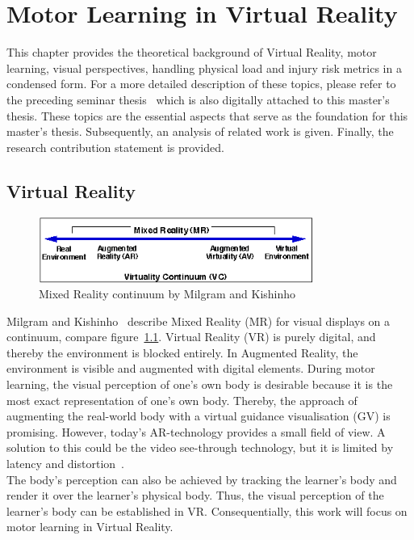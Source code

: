 \chapter{Motor Learning in Virtual Reality}
\label{chapter:theoretical_background}
This chapter provides the theoretical background of Virtual Reality, motor learning, visual perspectives, handling physical load and injury risk metrics in a condensed form. For a more detailed description of these topics, please refer to the preceding seminar thesis~\cite{seminarThesis} which is also digitally attached to this master's thesis. These topics are the essential aspects that serve as the foundation for this master's thesis. Subsequently, an analysis of related work is given. Finally, the research contribution statement is provided.

\section{Virtual Reality}
\label{section:mixed_reality}
\begin{figure}[htb]
	\centering
	\includegraphics[width=0.8\textwidth]{figures/milgram_continuum.png}
	\caption[Mixed Reality continuum by Milgram et al.]{Mixed Reality continuum by Milgram and Kishinho~\cite{mrcontinuum}}
	\label{fig:mrCont}
\end{figure}
Milgram and Kishinho~\cite{mrcontinuum} describe Mixed Reality (MR) for visual displays on a continuum, compare figure~\ref{fig:mrCont}. Virtual Reality (VR) is purely digital, and thereby the environment is blocked entirely. In Augmented Reality, the environment is visible and augmented with digital elements. During motor learning, the visual perception of one's own body is desirable because it is the most exact representation of one's own body. Thereby, the approach of augmenting the real-world body with a virtual guidance visualisation (GV) is promising. However, today's AR-technology provides a small field of view. A solution to this could be the video see-through technology, but it is limited by latency and distortion~\cite{max}.\\
The body's perception can also be achieved by tracking the learner's body and render it over the learner's physical body. Thus, the visual perception of the learner's body can be established in VR. Consequentially, this work will focus on motor learning in Virtual Reality.


